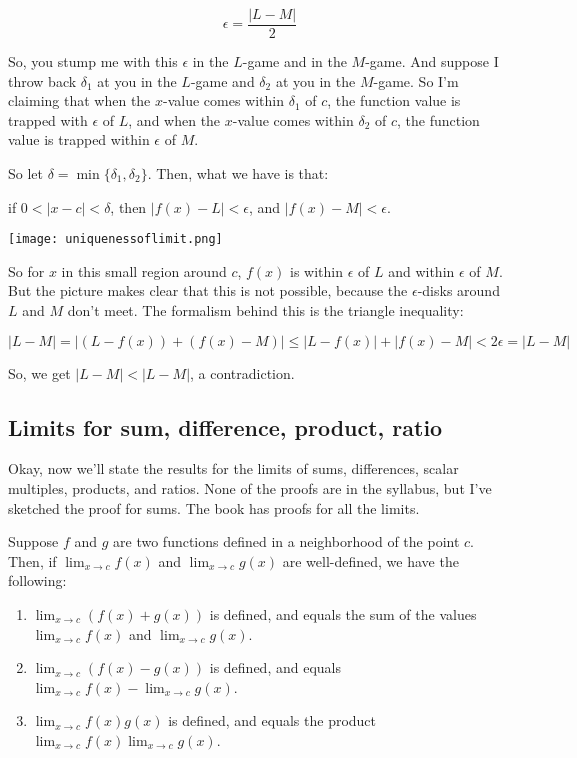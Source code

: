 \documentclass[10pt]{amsart}
\begin{document}
$$\epsilon = \frac{|L-M|}{2}$$

So, you stump me with this $\epsilon$ in the $L$-game and in the
$M$-game. And suppose I throw back $\delta_1$ at you in the $L$-game
and $\delta_2$ at you in the $M$-game. So I'm claiming that when the
$x$-value comes within $\delta_1$ of $c$, the function value is
trapped with $\epsilon$ of $L$, and when the $x$-value comes within
$\delta_2$ of $c$, the function value is trapped within $\epsilon$ of
$M$.

So let $\delta = \min\{\delta_1,\delta_2 \}$. Then, what we have is that:

if $0 < |x - c| < \delta$, then $|f(x) - L| < \epsilon$, and $|f(x) -
M| < \epsilon$.

\texttt{[image: uniquenessoflimit.png]}

So for $x$ in this small region around $c$, $f(x)$ is within
$\epsilon$ of $L$ and within $\epsilon$ of $M$. But the picture makes
clear that this is not possible, because the $\epsilon$-disks around
$L$ and $M$ don't meet. The formalism behind this is the triangle inequality:

$$|L - M| = |(L - f(x)) + (f(x) - M)| \le |L - f(x)| + |f(x) - M| < 2\epsilon = |L - M|$$

So, we get $|L - M| < |L - M|$, a contradiction.

\subsection{Limits for sum, difference, product, ratio}

Okay, now we'll state the results for the limits of sums, differences,
scalar multiples, products, and ratios. None of the proofs are in the
syllabus, but I've sketched the proof for sums. The book has proofs
for all the limits.

Suppose $f$ and $g$ are two functions defined in a neighborhood of the
point $c$. Then, if $\lim_{x \to c}f(x)$ and $\lim_{x \to c}g(x)$ are
well-defined, we have the following:

\begin{enumerate}

\item $\lim_{x \to c} (f(x) + g(x))$ is defined, and equals the sum of
  the values $\lim_{x \to c}f(x)$ and $\lim_{x \to c}g(x)$.

\item $\lim_{x \to c} (f(x) - g(x))$ is defined, and equals $\lim_{x
  \to c} f(x) - \lim_{x \to c} g(x)$.

\item $\lim_{x \to c} f(x)g(x)$ is defined, and equals the
  product $\lim_{x \to c} f(x) \lim_{x \to c} g(x)$.

\end{enumerate}
\end{document}
